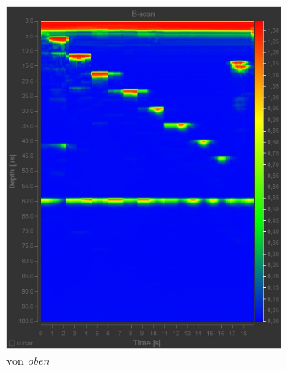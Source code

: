 \begin{figure}[h!]
	\centering
	\begin{subfigure}{.35\textwidth}
		\includegraphics[width=\textwidth]{oben.png}
		\caption{von \emph{oben}}
		\label{fig:oben}
	\end{subfigure}
	\begin{subfigure}{.35\textwidth}

\end{subfigure}
\end{figure}
